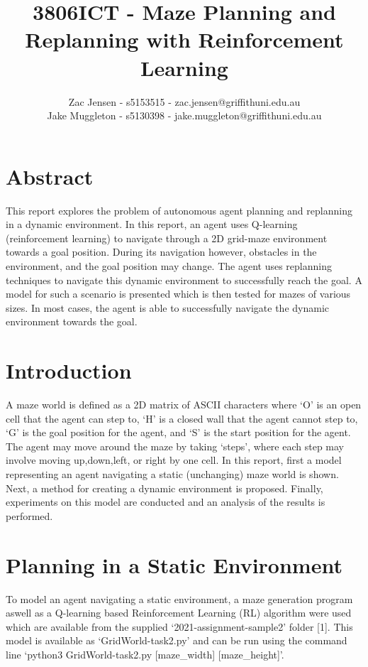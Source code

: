 \documentclass{article}
\title{3806ICT - Maze Planning and Replanning with Reinforcement Learning}
\author{Zac Jensen - s5153515 - zac.jensen@griffithuni.edu.au \\
    Jake Muggleton - s5130398 - jake.muggleton@griffithuni.edu.au}
\begin{document}
    \maketitle


    \section{Abstract}\label{sec:abstract}
        This report explores the problem of autonomous agent planning and replanning in a dynamic environment. In this report, an agent uses Q-learning (reinforcement learning) to navigate through a 2D grid-maze environment towards a goal position. During its navigation however, obstacles in the environment, and the goal position may change. The agent uses replanning techniques to navigate this dynamic environment to successfully reach the goal. A model for such a scenario is presented which is then tested for mazes of various sizes. In most cases, the agent is able to successfully navigate the dynamic environment towards the goal. 

    \section{Introduction}\label{sec:introduction}
        A maze world is defined as a 2D matrix of ASCII characters where ‘O’ is an open cell that the agent can step to, ‘H’ is a closed wall that the agent cannot step to, ‘G’ is the goal position for the agent, and ‘S’ is the start position for the agent. The agent may move around the maze by taking ‘steps’, where each step may involve moving up,down,left, or right by one cell. In this report, first a model representing an agent navigating a static (unchanging) maze world is shown. Next, a method for creating a dynamic environment is proposed. Finally, experiments on this model are conducted and an analysis of the results is performed.

    \section{Planning in a Static Environment}\label{sec:test-design}
        To model an agent navigating a static environment, a maze generation program aswell as a Q-learning based Reinforcement Learning (RL) algorithm were used which are available from the supplied ‘2021-assignment-sample2’ folder [1]. This model is available as ‘GridWorld-task2.py’ and can be run using the command line ‘python3 GridWorld-task2.py [maze\_width] [maze\_height]’.
\end{document}
